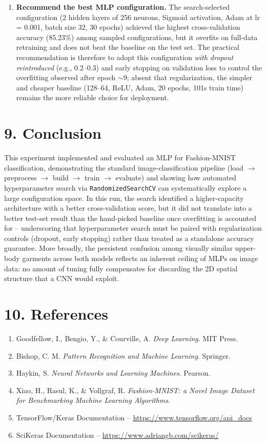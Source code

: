 \documentclass[11pt]{article}
\begin{document}
\begin{enumerate}
\item \textbf{Recommend the best MLP configuration.} The search-selected configuration (2 hidden layers of 256 neurons, Sigmoid activation, Adam at lr = 0.001, batch size 32, 30 epochs) achieved the highest cross-validation accuracy (85.23\%) among sampled configurations, but it overfits on full-data retraining and does not beat the baseline on the test set. The practical recommendation is therefore to adopt this configuration \emph{with dropout reintroduced} (e.g., 0.2--0.3) and early stopping on validation loss to control the overfitting observed after epoch $\sim$9; absent that regularization, the simpler and cheaper baseline (128--64, ReLU, Adam, 20 epochs, 101s train time) remains the more reliable choice for deployment.
\end{enumerate}

\section*{9. Conclusion}
This experiment implemented and evaluated an MLP for Fashion-MNIST classification, demonstrating the standard image-classification pipeline (load $\rightarrow$ preprocess $\rightarrow$ build $\rightarrow$ train $\rightarrow$ evaluate) and showing how automated hyperparameter search via \texttt{RandomizedSearchCV} can systematically explore a large configuration space. In this run, the search identified a higher-capacity architecture with a better cross-validation score, but it did not translate into a better test-set result than the hand-picked baseline once overfitting is accounted for -- underscoring that hyperparameter search must be paired with regularization controls (dropout, early stopping) rather than treated as a standalone accuracy guarantee. More broadly, the persistent confusion among visually similar upper-body garments across both models reflects an inherent ceiling of MLPs on image data: no amount of tuning fully compensates for discarding the 2D spatial structure that a CNN would exploit.

\section*{10. References}
\begin{enumerate}
\item Goodfellow, I., Bengio, Y., \& Courville, A. \emph{Deep Learning}. MIT Press.
\item Bishop, C. M. \emph{Pattern Recognition and Machine Learning}. Springer.
\item Haykin, S. \emph{Neural Networks and Learning Machines}. Pearson.
\item Xiao, H., Rasul, K., \& Vollgraf, R. \emph{Fashion-MNIST: a Novel Image Dataset for Benchmarking Machine Learning Algorithms}.
\item TensorFlow/Keras Documentation -- \url{https://www.tensorflow.org/api_docs}
\item SciKeras Documentation -- \url{https://www.adriangb.com/scikeras/}
\end{enumerate}
\end{document}

